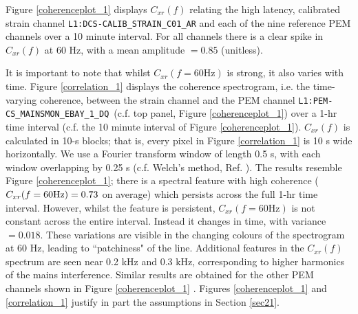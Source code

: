 \documentclass[pra,superscriptaddress,reprint,amsmath,amssymb,nofootinbib]{revtex4-2}
\newcommand{\PEMChanName}{\texttt{L1:PEM-CS\_MAINSMON\_EBAY\_1\_DQ}}
\begin{document}
Figure \ref{coherenceplot_1} displays $C_{xr}(f)$ relating the high latency, calibrated strain channel \texttt{L1:DCS-CALIB\_STRAIN\_C01\_AR} and each of the nine reference PEM channels over a 10 minute interval. For all channels there is a clear spike in $C_{xr}(f)$ at 60 Hz, with a mean amplitude $=0.85$ (unitless). \newline 

 It is important to note that whilst $C_{xr}(f=60 \text{Hz})$ is strong, it also varies with time. Figure \ref{correlation_1} displays the coherence spectrogram, i.e. the time-varying coherence, between the strain channel and the PEM channel \PEMChanName \, (c.f. top panel, Figure \ref{coherenceplot_1}) over a 1-hr time interval (c.f. the 10 minute interval of Figure \ref{coherenceplot_1}). $C_{xr}(f)$ is calculated in 10-s blocks; that is, every pixel in Figure \ref{correlation_1} is 10 s wide horizontally. We use a Fourier transform window of length 0.5 s, with each window overlapping by 0.25 s (c.f. Welch's method, Ref. \citep{Welch1161901}). The results resemble Figure \ref{coherenceplot_1}; there is a spectral feature with high coherence ($C_{xr}(f=60 \rm Hz) = 0.73$ on average) which persists across the full 1-hr time interval. However, whilst the feature is persistent, $C_{xr}(f=60 \text{Hz})$ is not constant across the entire interval. Instead it changes in time, with variance $=0.018$. These variations are visible in the changing colours of the spectrogram at 60 Hz, leading to ``patchiness" of the line. Additional features in the $C_{xr}(f)$ spectrum are seen near 0.2 kHz and 0.3 kHz, corresponding to higher harmonics of the mains interference. Similar results are obtained for the other PEM channels shown in Figure \ref{coherenceplot_1}	. Figures  \ref{coherenceplot_1} and  \ref{correlation_1} justify in part the assumptions in Section \ref{sec21}.
\end{document}
